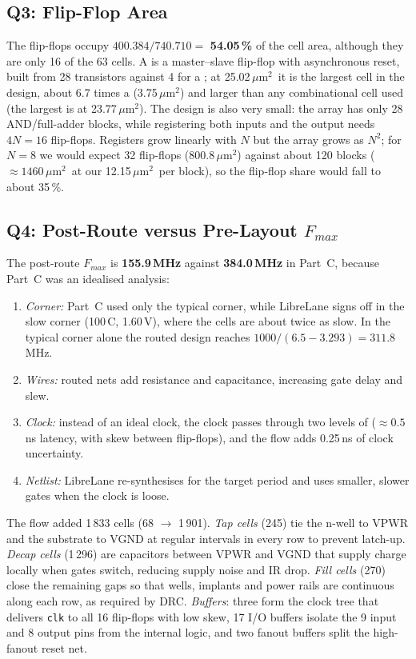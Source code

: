 \documentclass[conference]{IEEEtran}
\newcommand{\umsq}{\,$\mu$m$^2$}
\newcommand{\cell}[1]{\texttt{\detokenize{#1}}}
\begin{document}
\subsection{Q3: Flip-Flop Area}
The flip-flops occupy $400.384/740.710 = $ \textbf{54.05\,\%} of the cell area, although they are only 16 of
the 63 cells. A \cell{dfrtp_1} is a master--slave flip-flop with asynchronous reset, built from 28 transistors against 4 for a
\cell{nand2_1}; at 25.02\umsq\ it is the
largest cell in the design, about 6.7 times a \cell{nand2_1} (3.75\umsq) and larger than any combinational
cell used (the largest is \cell{xor3_1} at 23.77\umsq). The design is also very small: the array has only
28 AND/full-adder blocks, while registering both inputs and the output needs $4N = 16$ flip-flops. Registers
grow linearly with $N$ but the array grows as $N^2$; for $N = 8$ we would expect 32 flip-flops
(800.8\umsq) against about 120 blocks ($\approx 1460$\umsq\ at our 12.15\umsq\ per block), so the
flip-flop share would fall to about 35\,\%.

\subsection{Q4: Post-Route versus Pre-Layout $F_{max}$}
The post-route $F_{max}$ is \textbf{155.9\,MHz} against \textbf{384.0\,MHz} in Part~C, because Part~C was an
idealised analysis:
\begin{enumerate}
    \item \emph{Corner:} Part~C used only the typical corner, while LibreLane signs off in the slow corner
          (100\,\textdegree C, 1.60\,V), where the cells are about twice as slow. In the typical corner alone the
          routed design reaches $1000/(6.5-3.293) = 311.8$\,MHz.
    \item \emph{Wires:} routed nets add resistance and capacitance, increasing gate delay and slew.
    \item \emph{Clock:} instead of an ideal clock, the clock passes through two levels of \cell{clkbuf_16}
          ($\approx 0.5$\,ns latency, with skew between flip-flops), and the flow adds 0.25\,ns of clock
          uncertainty.
    \item \emph{Netlist:} LibreLane re-synthesises for the target period and uses smaller, slower gates when
          the clock is loose.
\end{enumerate}
The flow added 1\,833 cells (68 $\rightarrow$ 1\,901). \emph{Tap cells} (245) tie the n-well to VPWR and the
substrate to VGND at regular intervals in every row to prevent latch-up. \emph{Decap cells} (1\,296) are
capacitors between VPWR and VGND that supply charge locally when gates switch, reducing supply noise and
IR drop. \emph{Fill cells} (270) close the remaining gaps so that wells, implants and power rails are
continuous along each row, as required by DRC. \emph{Buffers}: three \cell{clkbuf_16} form the clock tree
that delivers \texttt{clk} to all 16 flip-flops with low skew, 17 \cell{buf_2} I/O buffers isolate the 9
input and 8 output pins from the internal logic, and two fanout buffers split the high-fanout reset net.
\end{document}
